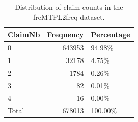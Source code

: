 \begin{table}
\caption{Distribution of claim counts in the freMTPL2freq dataset.}
\label{tab:claim_dist}
\begin{tabular}{lrl}
\toprule
ClaimNb & Frequency & Percentage \\
\midrule
0 & 643953 & 94.98\% \\
1 & 32178 & 4.75\% \\
2 & 1784 & 0.26\% \\
3 & 82 & 0.01\% \\
4+ & 16 & 0.00\% \\
Total & 678013 & 100.00\% \\
\bottomrule
\end{tabular}
\end{table}
